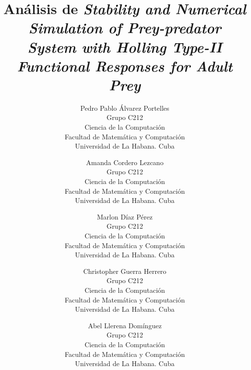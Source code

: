 \documentclass{wscpaperproc}
\theoremstyle{wsc}
\begin{document}
%
%

\title{Análisis de {\it Stability and Numerical Simulation of Prey-predator System with Holling
			Type-II Functional Responses for Adult Prey}}

\author{
	Pedro Pablo Álvarez Portelles\\[12pt]
	Grupo C212\\
	Ciencia de la Computación\\
	Facultad de Matemática y Computación\\
	Universidad de La Habana. Cuba\\
	\and
	Amanda Cordero Lezcano\\[12pt]
	Grupo C212\\
	Ciencia de la Computación\\
	Facultad de Matemática y Computación\\
	Universidad de La Habana. Cuba\\
	\and
	Marlon Díaz Pérez\\[12pt]
	Grupo C212\\
	Ciencia de la Computación\\
	Facultad de Matemática y Computación\\
	Universidad de La Habana. Cuba\\
	\and
	Christopher Guerra Herrero\\[12pt]
	Grupo C212\\
	Ciencia de la Computación\\
	Facultad de Matemática y Computación\\
	Universidad de La Habana. Cuba\\
	\and
	Abel Llerena Domínguez\\[12pt]
	Grupo C212\\
	Ciencia de la Computación\\
	Facultad de Matemática y Computación\\
	Universidad de La Habana. Cuba\\
}
\end{document}
